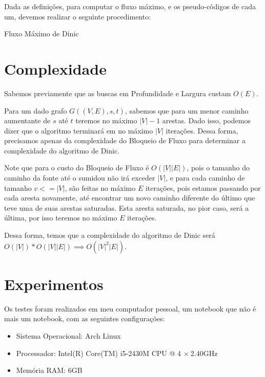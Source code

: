 \documentclass[
	12pt,
	a4paper,
	onepage,
	brazil
]{article}
\theoremstyle{definition}
\begin{document}
	Dada as definições, para computar o fluxo máximo, e os pseudo-códigos de cada um, devemos realizar o seguinte procedimento:
	
	\begin{algorithm}[H]
	\SetAlgoLined
	
	
	\caption{Fluxo Máximo de Dinic}
	\end{algorithm}
	
	\section{Complexidade}
	
	Sabemos previamente que as buscas em Profundidade e Largura custam $O(E)$.
	
	Para um dado grafo $G((V,E), s, t)$, sabemos que para um menor caminho aumentante de $s$ até $t$ teremos no máximo $|V|-1$ arestas. Dado isso, podemos dizer que o algoritmo terminará em no máximo $|V|$ iterações. Dessa forma, precisamos apenas da complexidade do Bloqueio de Fluxo para determinar a complexidade do algoritmo de Dinic.
	
	Note que para o custo do Bloqueio de Fluxo é $O(|V||E|)$, pois o tamanho do caminho da fonte até o sumidou não irá exceder $|V|$, e para cada caminho de tamanho $v <= |V|$, são feitas no máximo $E$ iterações, pois estamos passando por cada aresta novamente, até encontrar um novo caminho diferente do último que teve uma de suas arestas saturadas. Esta aresta saturada, no pior caso, será a última, por isso teremos no máximo $E$ iterações.
	
	Dessa forma, temos que a complexidade do algoritmo de Dinic será $O(|V|)*O(|V||E|) \implies O(|V|^2|E|)$.
	
	\section{Experimentos}
	
	Os testes foram realizados em meu computador pessoal, um notebook que não é mais um notebook, com as seguintes configurações:
	
	\begin{itemize}
		\item Sistema Operacional: Arch Linux
		\item Processador: Intel(R) Core(TM) i5-2430M CPU @ 4 $\times \ $2.40GHz
		\item Memória RAM: 6GB
	\end{itemize}
\end{document}
